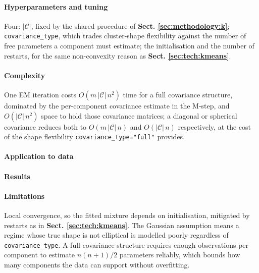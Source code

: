 \paragraph{Hyperparameters and tuning}
\label{sec:tech:gmm:hyperparameters}
Four: $|\mathcal C|$, fixed by the shared procedure of \textbf{Sect. \ref{sec:methodology:k}}; \texttt{covariance\_type}, which trades cluster-shape flexibility against the number of free parameters a component must estimate; the initialisation and the number of restarts, for the same non-convexity reason as \textbf{Sect. \ref{sec:tech:kmeans}}.

\paragraph{Complexity}
\label{sec:tech:gmm:complexity}
One EM iteration costs $O(m \, |\mathcal C| \, n^2)$ time for a full covariance structure, dominated by the per-component covariance estimate in the M-step, and $O(|\mathcal C| \, n^2)$ space to hold those covariance matrices; a diagonal or spherical covariance reduces both to $O(m \, |\mathcal C| \, n)$ and $O(|\mathcal C| \, n)$ respectively, at the cost of the shape flexibility \texttt{covariance\_type="full"} provides.

\paragraph{Application to \projectname{} data}
\label{sec:tech:gmm:application}

\paragraph{Results}
\label{sec:tech:gmm:results}

\paragraph{Limitations}
\label{sec:tech:gmm:limitations}
Local convergence, so the fitted mixture depends on initialisation, mitigated by restarts as in \textbf{Sect. \ref{sec:tech:kmeans}}. The Gaussian assumption means a regime whose true shape is not elliptical is modelled poorly regardless of \texttt{covariance\_type}. A full covariance structure requires enough observations per component to estimate $n(n+1)/2$ parameters reliably, which bounds how many components the data can support without overfitting.

